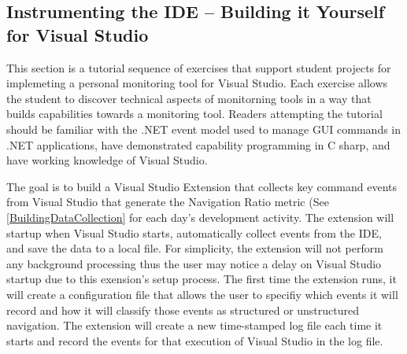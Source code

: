 \subsection{Instrumenting the IDE -- Building it Yourself for Visual Studio} 
\label{buildItYourself}

This section is a tutorial sequence of exercises that support student projects for implemeting a personal monitoring tool for Visual Studio.  Each exercise allows the student to discover technical aspects of monitorning tools in a way that builds capabilities towards a monitoring tool.  Readers attempting the tutorial should be familiar with the .NET event model used to manage GUI commands in .NET applications, have demonstrated capability programming in C sharp, and have working knowledge of Visual Studio.  

The goal is to build a Visual Studio Extension that collects key command events from Visual Studio that generate the Navigation Ratio metric (See \ref{BuildingDataCollection} for each day's development activity.  The extension will startup when Visual Studio starts, automatically collect events from the IDE, and save the data to a local file.  For simplicity, the extension will not perform any background processing thus the user may notice a delay on Visual Studio startup due to this exension's setup process.  The first time the extension runs, it will create a configuration file that allows the user to specifiy which events it will record and how it will classify those events as structured or unstructured navigation.  The extension will create a new time-stamped log file each time it starts and record the events for that execution of Visual Studio in the log file. 


